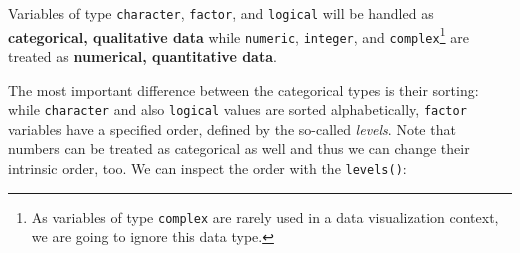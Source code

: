 \documentclass[
]{krantz}
\makeatletter
\newenvironment{Shaded}{\begin{snugshade}}{\end{snugshade}}
\newcommand{\DocumentationTok}[1]{\textcolor[rgb]{0.37,0.37,0.37}{\textbf{\textit{#1}}}}
\newcommand{\FunctionTok}[1]{\textcolor[rgb]{0,0,0}{#1}}
\newcommand{\NormalTok}[1]{#1}
\newcommand{\SpecialCharTok}[1]{\textcolor[rgb]{0,0,0}{#1}}
\newenvironment{kframe}{%
\medskip{}
\setlength{\fboxsep}{.8em}
 \def\at@end@of@kframe{}%
 \ifinner\ifhmode%
  \def\at@end@of@kframe{\end{minipage}}%
  \begin{minipage}{\columnwidth}%
 \fi\fi%
 \def\FrameCommand##1{\hskip\@totalleftmargin \hskip-\fboxsep
 \colorbox{shadecolor}{##1}\hskip-\fboxsep
     \hskip-\linewidth \hskip-\@totalleftmargin \hskip\columnwidth}%
 \MakeFramed {\advance\hsize-\width
   \@totalleftmargin\z@ \linewidth\hsize
   \@setminipage}}%
 {\par\unskip\endMakeFramed%
 \at@end@of@kframe}
\renewenvironment{Shaded}{\begin{kframe}}{\end{kframe}}
\makeatother
\begin{document}
\begin{Shaded}
\end{Shaded}

Variables of type \texttt{character}, \texttt{factor}, and \texttt{logical} will be handled as \textbf{categorical, qualitative data} while \texttt{numeric}, \texttt{integer}, and \texttt{complex}\footnote{As variables of type \texttt{complex} are rarely used in a data visualization context, we are going to ignore this data type.} are treated as \textbf{numerical, quantitative data}.

The most important difference between the categorical types is their sorting: while \texttt{character} and also \texttt{logical} values are sorted alphabetically, \texttt{factor} variables have a specified order, defined by the so-called \emph{levels}. Note that numbers can be treated as categorical as well and thus we can change their intrinsic order, too. We can inspect the order with the \texttt{levels()}:

\begin{Shaded}
\end{Shaded}
\end{document}
